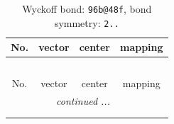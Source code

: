 \documentclass[fleqn,8pt]{jsarticle}
\begin{document}
\renewcommand{\arraystretch}{1.2}
\begin{longtable}{cccc}
\caption{Wyckoff bond: {\tt 96b@48f}, bond symmetry: {\tt 2..}}
 \\
 \hline \hline
No. & vector & center & mapping \\ \hline \endfirsthead

\multicolumn{3}{l}{\tablename\ \thetable{}} \\
 \hline \hline
No. & vector & center & mapping \\ \hline \endhead

 \hline \hline
\multicolumn{3}{r}{\footnotesize\it continued ...} \\ \endfoot

 \hline \hline
\multicolumn{3}{r}{} \\ \endlastfoot


\end{longtable}
\end{document}
